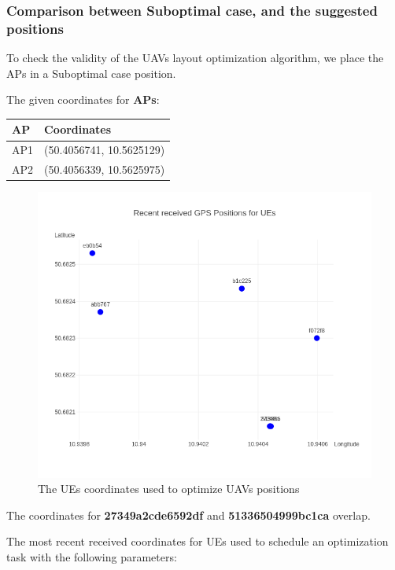 \hypertarget{comparison-between-suboptimal-case-and-the-suggested-positions}{%
\subsubsection{Comparison between Suboptimal case, and the suggested
positions}\label{comparison-between-suboptimal-case-and-the-suggested-positions}}

To check the validity of the UAVs layout optimization algorithm, we
place the APs in a Suboptimal case position.

The given coordinates for \textbf{APs}:

\begin{longtable}[]{@{}ll@{}}
\toprule
AP & Coordinates\tabularnewline
\midrule
\endhead
AP1 & (50.4056741, 10.5625129)\tabularnewline
AP2 & (50.4056339, 10.5625975)\tabularnewline
\bottomrule
\end{longtable}

\begin{figure}[H]
	\centering
	\includegraphics[width=\linewidth,keepaspectratio]{images/Exp4_UEs_Location_to_optimize.png}
\caption{The UEs coordinates used to optimize UAVs positions}
\end{figure}

The coordinates for \textbf{27349a2cde6592df} and
\textbf{51336504999bc1ca} overlap.

The most recent received coordinates for UEs used to schedule an
optimization task with the following parameters:

